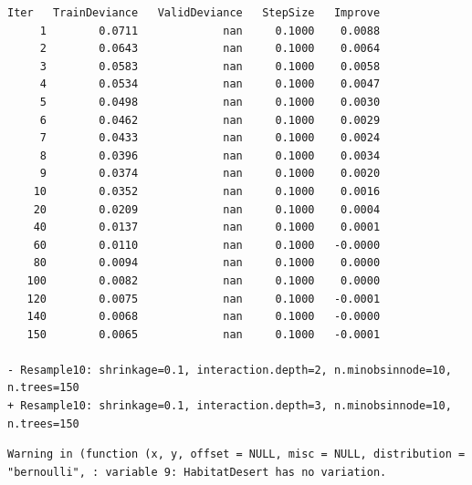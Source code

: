 \documentclass[
  letterpaper,
  DIV=11,
  numbers=noendperiod]{scrartcl}
\begin{document}
\begin{verbatim}
Iter   TrainDeviance   ValidDeviance   StepSize   Improve
     1        0.0711             nan     0.1000    0.0088
     2        0.0643             nan     0.1000    0.0064
     3        0.0583             nan     0.1000    0.0058
     4        0.0534             nan     0.1000    0.0047
     5        0.0498             nan     0.1000    0.0030
     6        0.0462             nan     0.1000    0.0029
     7        0.0433             nan     0.1000    0.0024
     8        0.0396             nan     0.1000    0.0034
     9        0.0374             nan     0.1000    0.0020
    10        0.0352             nan     0.1000    0.0016
    20        0.0209             nan     0.1000    0.0004
    40        0.0137             nan     0.1000    0.0001
    60        0.0110             nan     0.1000   -0.0000
    80        0.0094             nan     0.1000    0.0000
   100        0.0082             nan     0.1000    0.0000
   120        0.0075             nan     0.1000   -0.0001
   140        0.0068             nan     0.1000   -0.0000
   150        0.0065             nan     0.1000   -0.0001

- Resample10: shrinkage=0.1, interaction.depth=2, n.minobsinnode=10, n.trees=150 
+ Resample10: shrinkage=0.1, interaction.depth=3, n.minobsinnode=10, n.trees=150 
\end{verbatim}

\begin{verbatim}
Warning in (function (x, y, offset = NULL, misc = NULL, distribution =
"bernoulli", : variable 9: HabitatDesert has no variation.
\end{verbatim}
\end{document}
